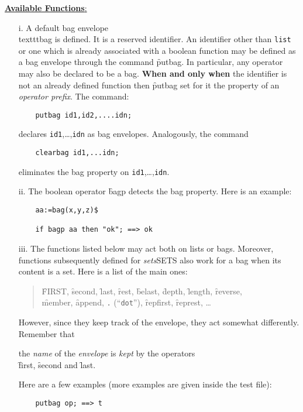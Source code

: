 \underline{\textbf{Available Functions}:}

\begin{itemize}
\item[i.] A default bag envelope \\texttt{bag} is defined.
\hypertarget{reserved:BAG}{}
It is a reserved identifier.
\hypertarget{operator:PUTBAG}{}
\hypertarget{operator:CLEARBAG}{}
\hypertarget{operator:BAGP}{}
An identifier other than \texttt{list} or one which is already associated
with a boolean function may be defined as a bag envelope through the
command \f{putbag}. In particular, any operator may also be declared
to be a bag. \textbf{When and only when} the identifier is not an already defined
function then \f{putbag} set for it the property of an \emph{operator prefix}.
The command:
\begin{verbatim}
    putbag id1,id2,....idn;
\end{verbatim}
declares \texttt{id1},\ldots,\texttt{idn} as bag envelopes.
Analogously, the command
\begin{verbatim}
    clearbag id1,...idn;
\end{verbatim}
eliminates the bag property on \texttt{id1},\ldots,\texttt{idn}.
\item[ii.] The boolean operator \f{bagp} detects the bag property.
Here is an example:
\begin{verbatim}
    aa:=bag(x,y,z)$

    if bagp aa then "ok"; ==> ok
\end{verbatim}
\item[iii.] The functions listed below may act both on lists or bags.
Moreover, functions subsequently  defined for  \emph{sets}SETS also work for a bag
when its content is a set.
Here is a list of the main ones:

\begin{quote}
\f{FIRST}, \f{second}, \f{last}, \f{rest}, \f{belast}, \f{depth}, \f{length}, \f{reverse},\\
\f{member}, \f{append}, \texttt{.} (``\texttt{dot}''), \f{repfirst}, \f{represt}, \ldots
\end{quote}

However, since they keep track of the envelope, they act
somewhat differently. Remember that   
\vspace{5pt}
\begin{center}
the \emph{name} of the \emph{envelope} is \emph{kept} by the operators \\[3pt]
\f{first}, \f{second} and \f{last}.
\end{center}
Here are a few examples (more examples are
given inside the test file):
\begin{verbatim}
    putbag op; ==> t


\end{verbatim}
\end{itemize}
